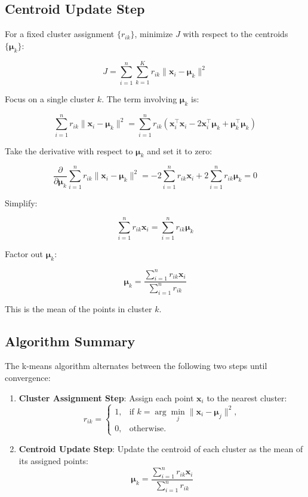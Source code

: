 \documentclass[12pt,twoside,a4paper,parskip]{scrbook} %
\begin{document}
\subsection*{Centroid Update Step}
For a fixed cluster assignment \( \{ r_{ik} \} \), minimize \( J \) with respect to the centroids \( \{ \boldsymbol{\mu}_k \} \):

\[
J = \sum_{i=1}^{n} \sum_{k=1}^{K} r_{ik} \| \mathbf{x}_i - \boldsymbol{\mu}_k \|^2
\]

Focus on a single cluster \( k \). The term involving \( \boldsymbol{\mu}_k \) is:

\[
\sum_{i=1}^{n} r_{ik} \| \mathbf{x}_i - \boldsymbol{\mu}_k \|^2
= \sum_{i=1}^{n} r_{ik} \left( \mathbf{x}_i^\top \mathbf{x}_i - 2 \mathbf{x}_i^\top \boldsymbol{\mu}_k + \boldsymbol{\mu}_k^\top \boldsymbol{\mu}_k \right)
\]

Take the derivative with respect to \( \boldsymbol{\mu}_k \) and set it to zero:

\[
\frac{\partial}{\partial \boldsymbol{\mu}_k} \sum_{i=1}^{n} r_{ik} \| \mathbf{x}_i - \boldsymbol{\mu}_k \|^2 =
-2 \sum_{i=1}^{n} r_{ik} \mathbf{x}_i + 2 \sum_{i=1}^{n} r_{ik} \boldsymbol{\mu}_k = 0
\]

Simplify:

\[
\sum_{i=1}^{n} r_{ik} \mathbf{x}_i = \sum_{i=1}^{n} r_{ik} \boldsymbol{\mu}_k
\]

Factor out \( \boldsymbol{\mu}_k \):

\[
\boldsymbol{\mu}_k = \frac{\sum_{i=1}^{n} r_{ik} \mathbf{x}_i}{\sum_{i=1}^{n} r_{ik}}
\]

This is the mean of the points in cluster \( k \).

\subsection*{Algorithm Summary}
The k-means algorithm alternates between the following two steps until convergence:

\begin{enumerate}
    \item \textbf{Cluster Assignment Step}: Assign each point \( \mathbf{x}_i \) to the nearest cluster:
    \[
    r_{ik} =
    \begin{cases} 
    1, & \text{if } k = \arg\min_{j} \| \mathbf{x}_i - \boldsymbol{\mu}_j \|^2, \\
    0, & \text{otherwise.}
    \end{cases}
    \]
    \item \textbf{Centroid Update Step}: Update the centroid of each cluster as the mean of its assigned points:
    \[
    \boldsymbol{\mu}_k = \frac{\sum_{i=1}^{n} r_{ik} \mathbf{x}_i}{\sum_{i=1}^{n} r_{ik}}
    \]
\end{enumerate}
\end{document}
